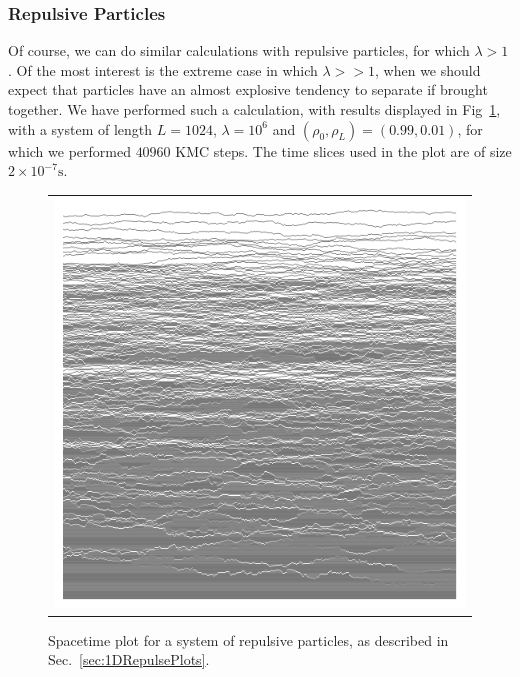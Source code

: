 \subsubsection{Repulsive Particles}
Of course, we can do similar calculations with repulsive particles, for which $\lambda > 1$. Of the most
interest is the extreme case in which $\lambda >> 1$, when we should expect that particles have an almost 
explosive tendency to separate if brought together. We have performed such a calculation, with results
displayed in Fig~\ref{fig:1DRepulsePlots}, with a system
of length $L=1024$, $\lambda = 10^6$ and $(\rho_0 , \rho_L) = (0.99, 0.01)$, for which we performed $40960$
KMC steps. The time slices used in the plot are of size  $2 \times 10^{-7} \mathrm{s}$.
\begin{figure} \caption[The flow pattern of repulsive particles in $1$D]{Spacetime plot for a system of 
repulsive particles, as described in Sec.~\ref{sec:1DRepulsePlots}.} 
\label{fig:1DRepulsePlots}
\begin{center}
\begin{tabular}{c} 
\includegraphics[width=0.8\linewidth]{numerics/images/stickyParticleFlows/aprilFlowStraight.png} \\

\end{tabular}
\end{center}
\end{figure}
